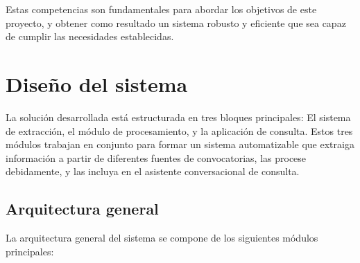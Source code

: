 Estas competencias son fundamentales para abordar los objetivos de este proyecto, y obtener como resultado un sistema robusto y eficiente que sea capaz de cumplir las necesidades establecidas. 


\section{Diseño del sistema}

La solución desarrollada está estructurada en tres bloques principales: El sistema de extracción, el módulo de procesamiento, y la aplicación de consulta.
Estos tres módulos trabajan en conjunto para formar un sistema automatizable que extraiga información a partir de diferentes fuentes de convocatorias, las procese debidamente, y las incluya en el asistente conversacional de consulta.

\subsection{Arquitectura general}

La arquitectura general del sistema se compone de los siguientes módulos principales:

